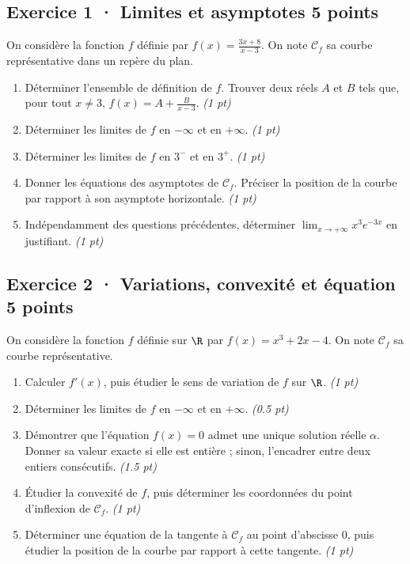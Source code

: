 \subsection*{Exercice 1 · Limites et asymptotes \hfill 5 points}On considère la fonction $f$ définie par $f(x)=\frac{3x+8}{x-3}$. On note $\mathcal C_f$ sa courbe représentative dans un repère du plan.

\begin{enumerate}

\item Déterminer l'ensemble de définition de $f$. Trouver deux réels $A$ et $B$ tels que, pour tout $x\ne3$, $f(x)=A+\frac B{x-3}$. \hfill\textit{(1 pt)}

\item Déterminer les limites de $f$ en $-\infty$ et en $+\infty$. \hfill\textit{(1 pt)}

\item Déterminer les limites de $f$ en $3^-$ et en $3^+$. \hfill\textit{(1 pt)}

\item Donner les équations des asymptotes de $\mathcal C_f$. Préciser la position de la courbe par rapport à son asymptote horizontale. \hfill\textit{(1 pt)}

\item Indépendamment des questions précédentes, déterminer $\displaystyle\lim_{x\to+\infty}x^{3}e^{-3x}$ en justifiant. \hfill\textit{(1 pt)}

\end{enumerate}

\subsection*{Exercice 2 · Variations, convexité et équation \hfill 5 points}On considère la fonction $f$ définie sur $\R$ par $f(x)=x^3+2x-4$. On note $\mathcal C_f$ sa courbe représentative.

\begin{enumerate}

\item Calculer $f' (x)$, puis étudier le sens de variation de $f$ sur $\R$. \hfill\textit{(1 pt)}

\item Déterminer les limites de $f$ en $-\infty$ et en $+\infty$. \hfill\textit{(\num{0,5} pt)}

\item Démontrer que l'équation $f(x)=0$ admet une unique solution réelle $\alpha$. Donner sa valeur exacte si elle est entière ; sinon, l'encadrer entre deux entiers consécutifs. \hfill\textit{(\num{1,5} pt)}

\item Étudier la convexité de $f$, puis déterminer les coordonnées du point d'inflexion de $\mathcal C_f$. \hfill\textit{(1 pt)}

\item Déterminer une équation de la tangente à $\mathcal C_f$ au point d'abscisse $0$, puis étudier la position de la courbe par rapport à cette tangente. \hfill\textit{(1 pt)}

\end{enumerate}

